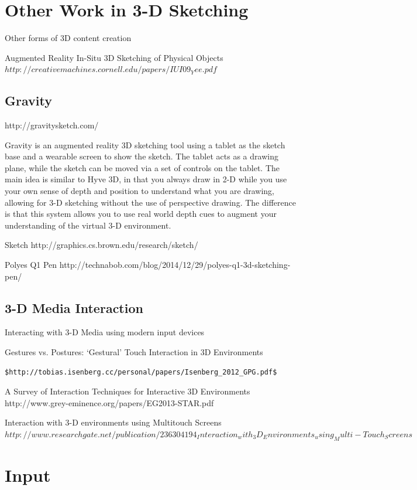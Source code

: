 \documentclass[12pt]{report}
\begin{document}
\section{Other Work in 3-D Sketching}

Other forms of 3D content creation

Augmented Reality In-Situ 3D Sketching of Physical Objects $http://creativemachines.cornell.edu/papers/IUI09_Yee.pdf$

\subsection{Gravity} http://gravitysketch.com/

Gravity is an augmented reality 3D sketching tool using a tablet as the sketch base and a wearable screen to show the sketch. The tablet acts as a drawing plane, while the sketch can be moved via a set of controls on the tablet. The main idea is similar to Hyve 3D, in that you always draw in 2-D while you use your own sense of depth and position to understand what you are drawing, allowing for 3-D sketching without the use of perspective drawing. The difference is that this system allows you to use real world depth cues to augment your understanding of the virtual 3-D environment.

Sketch http://graphics.cs.brown.edu/research/sketch/

Polyes Q1 Pen http://technabob.com/blog/2014/12/29/polyes-q1-3d-sketching-pen/

\subsection{3-D Media Interaction}

Interacting with 3-D Media using modern input devices

Gestures vs. Postures: ‘Gestural’ Touch Interaction in 3D Environments 

\begin{verbatim}
$http://tobias.isenberg.cc/personal/papers/Isenberg_2012_GPG.pdf$
\end{verbatim}
A Survey of Interaction Techniques for Interactive 3D Environments http://www.grey-eminence.org/papers/EG2013-STAR.pdf

Interaction with 3-D environments using Multitouch Screens $http://www.researchgate.net/publication/236304194_Interaction_with_3D_Environments_using_Multi-Touch_Screens$

\pagebreak
\section{Input}
\end{document}
